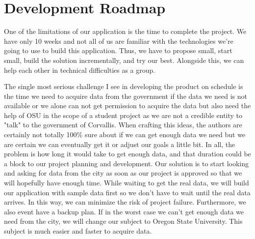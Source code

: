 \documentclass{article}
\begin{document}
\section{Development Roadmap}

One of the limitations of our application is the time to complete the project. We have only 10 weeks and not all of us are familiar with the technologies we're going to use to build this application. Thus, we have to propose small, start small, build the solution incrementally, and try our best. Alongside this, we can help each other in technical difficulties as a group.

The single most serious challenge I see in developing the product on schedule is the time we need to acquire data from the government if the data we need is not available or we alone can not get permission to acquire the data but also need the help of OSU in the scope of a student project as we are not a credible entity to "talk" to the government of Corvallis. When crafting this ideas, the authors are certainly not totally 100\% sure about if we can get enough data we need but we are certain we can eventually get it or adjust our goals a little bit. In all, the problem is how long it would take to get enough data, and that duration could be a block to our project planning and development. Our solution is to start looking and asking for data from the city as soon as our project is approved so that we will hopefully have enough time. While waiting to get the real data, we will build our application with sample data first so we don't have to wait until the real data arrives. In this way, we can minimize the risk of project failure. Furthermore, we also event have a backup plan. If in the worst case we can't get enough data we need from the city, we will change our subject to Oregon State University. This subject is much easier and faster to acquire data.




\end{document}
